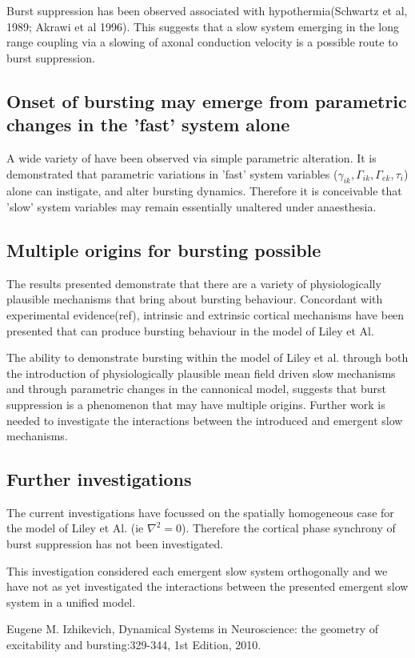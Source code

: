 \documentclass[a4paper,12pt]{article}
\begin{document}
Burst suppression has been observed associated with hypothermia(Schwartz et al, 1989; Akrawi et al 1996). This suggests
that a slow system emerging in the long range coupling via a slowing of axonal conduction velocity is a possible route
to burst suppression.

\subsection{Onset of bursting may emerge from parametric changes in the 'fast' system alone}
A wide variety of have been observed via simple parametric alteration. It is demonstrated that parametric variations in
'fast' system variables ($\gamma_{ik}, \Gamma_{ik}, \Gamma_{ek}, \tau_i$) alone can instigate, and alter bursting
dynamics. Therefore it is conceivable that 'slow' system variables may remain essentially unaltered under anaesthesia.

\subsection{Multiple origins for bursting possible}
The results presented demonstrate that there are a variety of physiologically plausible mechanisms that bring about
bursting behaviour. Concordant with experimental evidence(ref), intrinsic and extrinsic cortical mechanisms have been
presented that can produce bursting behaviour in the model of Liley et Al.

The ability to demonstrate bursting within the model of Liley et al. through both the introduction of physiologically
plausible mean field driven slow mechanisms and through parametric changes in the cannonical model, suggests that burst
suppression is a phenomenon that may have multiple origins. Further work is needed to investigate the interactions
between the introduced and emergent slow mechanisms.

\subsection{Further investigations}
The current investigations have focussed on the spatially homogeneous case for the model of Liley et Al. (ie $\nabla^2 =
0$). Therefore the cortical phase synchrony of burst suppression has not been investigated.

This investigation considered each emergent slow system orthogonally and we have not as yet investigated the
interactions between the presented emergent slow system in a unified model.


\begin{thebibliography}{999}

  Eugene M. Izhikevich,
  Dynamical Systems in Neuroscience: the geometry of excitability and bursting:329-344,
  1st Edition,
  2010.

\end{thebibliography}
\end{document}
